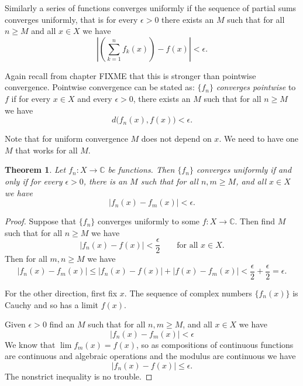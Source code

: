 \documentclass[12pt]{book}
\newcommand{\abs}[1]{\left\lvert {#1} \right\rvert}
\newcommand{\C}{{\mathbb{C}}}
\newcommand{\myindex}[1]{#1\index{#1}}
\theoremstyle{plain}
\newtheorem{thm}{Theorem}[section]
\theoremstyle{remark}
\theoremstyle{definition}
\theoremstyle{exercise}
\theoremstyle{example}
\begin{document}
Similarly a series of functions converges uniformly if the sequence of
partial sums converges uniformly, that is for every $\epsilon > 0$
there exists an $M$ such that
for all $n \geq M$ and all $x \in X$ we have
\begin{equation*}
\abs{\left(\sum_{k=1}^nf_k(x)\right)-f(x)} < \epsilon .
\end{equation*}

Again recall from chapter FIXME that this is stronger than pointwise
convergence.  Pointwise convergence can be stated as:
$\{f_n\}$ \emph{\myindex{converges pointwise}} to $f$ if
for every $x \in X$ and
every $\epsilon > 0$, there exists an $M$ such that
for all $n \geq M$ we have
\begin{equation*}
d\bigl(f_n(x),f(x)\bigr) < \epsilon .
\end{equation*}

Note that for uniform convergence $M$ does not depend on $x$.  We need to
have one $M$ that works for all $M$.

\begin{thm}
Let $f_n \colon X \to \C$ be functions.  Then $\{ f_n \}$ converges
uniformly if and only if for every $\epsilon > 0$, there is an $M$ such that
for all $n, m \geq M$, and all $x \in X$ we have
\begin{equation*}
\abs{f_n(x)-f_m(x)} < \epsilon .
\end{equation*}
\end{thm}

\begin{proof}
Suppose that $\{f_n\}$ converges uniformly to some $f \colon X \to \C$.  Then 
find $M$ such that for all $n \geq M$ we have
\begin{equation*}
\abs{f_n(x)-f(x)} < \frac{\epsilon}{2} \qquad \text{for all $x \in X$.}
\end{equation*}
Then for all $m,n \geq M$ we have
\begin{equation*}
\abs{f_n(x)-f_m(x)}
\leq
\abs{f_n(x)-f(x)} + \abs{f(x)-f_m(x)} < \frac{\epsilon}{2} + \frac{\epsilon}{2}
= \epsilon .
\end{equation*}

For the other direction, first fix $x$.
The sequence
of complex numbers $\{ f_n(x) \}$ is Cauchy and so has a limit
$f(x)$.

Given $\epsilon > 0$ find an $M$ such that
for all $n, m \geq M$, and all $x \in X$ we have
\begin{equation*}
\abs{f_n(x)-f_m(x)} < \epsilon
\end{equation*}
We know that $\lim f_m(x) = f(x)$, so
as compositions of continuous functions are continuous
and algebraic operations and the modulus are continuous we have
\begin{equation*}
\abs{f_n(x)-f(x)} \leq \epsilon .
\end{equation*}
The nonstrict inequality is no trouble.
\end{proof}
\end{document}
